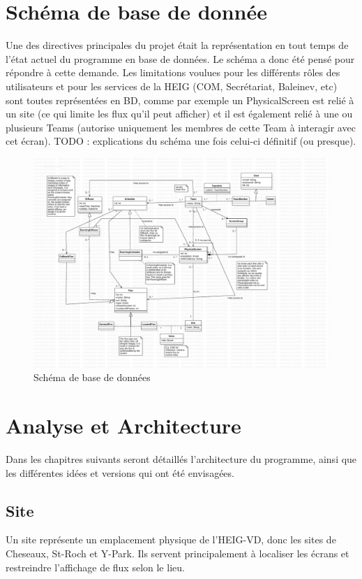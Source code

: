 \documentclass[french]{article}
\begin{document}
\newpage
\section{Schéma de base de donnée}
Une des directives principales du projet était la représentation en tout temps de l'état actuel du programme en base de données. Le schéma a donc été pensé pour répondre à cette demande. Les limitations voulues pour les différents rôles des utilisateurs et pour les services de la HEIG (COM, Secrétariat, Baleinev, etc) sont toutes représentées en BD, comme par exemple un PhysicalScreen est relié à un site (ce qui limite les flux qu'il peut afficher) et il est également relié à une ou plusieurs Teams (autorise uniquement les membres de cette Team à interagir avec cet écran).
\newline TODO : explications du schéma une fois celui-ci définitif (ou presque).

	\begin{figure}[h]
		\centering
		\includegraphics[scale=0.5]{db_schema}
		\caption{Schéma de base de données}
	\end{figure}

\newpage
\section{Analyse et Architecture}

Dans les chapitres suivants seront détaillés l'architecture du programme, ainsi que les différentes idées et versions qui ont été envisagées.

\subsection{Site}
Un site représente un emplacement physique de l'HEIG-VD, donc les sites de Cheseaux, St-Roch et Y-Park. Ils servent principalement à localiser les écrans et restreindre l'affichage de flux selon le lieu. 
\end{document}

